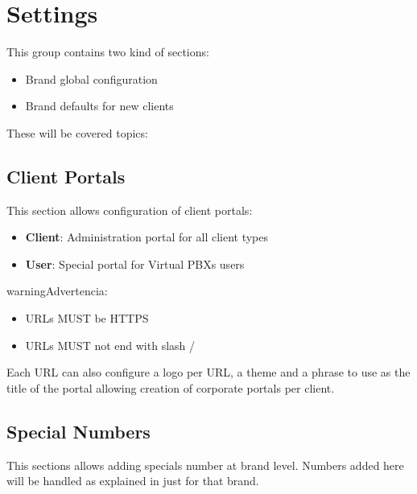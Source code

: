 \documentclass[letterpaper,10pt,spanish]{sphinxmanual}
\begin{document}
\section{Settings}
\label{administration_portal/brand/settings/index::doc}\label{administration_portal/brand/settings/index:settings}
This group contains two kind of sections:
\begin{itemize}
\item {} 
Brand global configuration

\item {} 
Brand defaults for new clients

\end{itemize}

These will be covered topics:


\subsection{Client Portals}
\label{administration_portal/brand/settings/client_portals:client-portals}\label{administration_portal/brand/settings/client_portals::doc}\label{administration_portal/brand/settings/client_portals:id1}
This section allows configuration of client portals:
\begin{itemize}
\item {} 
\textbf{Client}: Administration portal for all client types

\item {} 
\textbf{User}: Special portal for Virtual PBXs users

\end{itemize}

\begin{notice}{warning}{Advertencia:}\begin{itemize}
\item {} 
URLs MUST be HTTPS

\item {} 
URLs MUST not end with slash /

\end{itemize}
\end{notice}

Each URL can also configure a logo per URL, a theme and a phrase to use as
the title of the portal allowing creation of corporate portals per client.


\subsection{Special Numbers}
\label{administration_portal/brand/settings/special_numbers:special-numbers}\label{administration_portal/brand/settings/special_numbers::doc}
This sections allows adding specials number at brand level. Numbers added here will be handled as explained in
{\hyperref[administration_portal/platform/global_special_numbers:global\string-special\string-numbers]{}} just for that brand.
\end{document}
